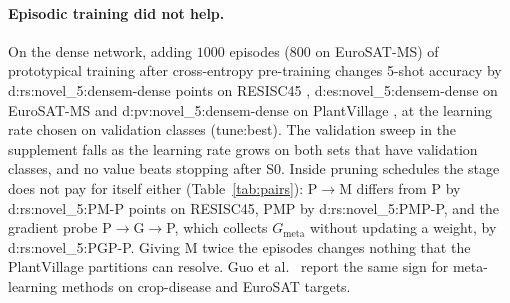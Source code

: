 \begin{table}[t]
  \centering\small\setlength{\tabcolsep}{4pt}
  
  \caption{Paired differences in points (mean over partitions, with the $95\%$ $t$-interval over partitions in brackets); (a $-$ b) is positive when a is more accurate. Test episodes are shared inside a partition. A dash marks a comparison that was not run on that dataset.}
  \label{tab:pairs}
\end{table}

\paragraph{Episodic training did not help.}
On the dense network, adding $1000$ episodes ($800$ on EuroSAT-MS) of prototypical training after cross-entropy pre-training changes 5-shot accuracy by \num{d:rs:novel_5:densem-dense} points on RESISC45 , \num{d:es:novel_5:densem-dense} on EuroSAT-MS  and \num{d:pv:novel_5:densem-dense} on PlantVillage , at the learning rate chosen on validation classes (\num{tune:best}). The validation sweep in the supplement falls as the learning rate grows on both sets that have validation classes, and no value beats stopping after S0. Inside pruning schedules the stage does not pay for itself either (Table~\ref{tab:pairs}): P$\to$M differs from P by \num{d:rs:novel_5:PM-P} points on RESISC45, PMP by \num{d:rs:novel_5:PMP-P}, and the gradient probe P$\to$G$\to$P, which collects $G_{\mathrm{meta}}$ without updating a weight, by \num{d:rs:novel_5:PGP-P}. Giving M twice the episodes changes nothing that the PlantVillage partitions can resolve. Guo et al.~\cite{guo2020bscd} report the same sign for meta-learning methods on crop-disease and EuroSAT targets.

\begin{table}[t]
  \centering\small\setlength{\tabcolsep}{4pt}
  
  \caption{Cost and 5-shot accuracy (\%). The pruned architecture is the same for every score, so one cost row serves all scores; accuracy is for DACIS under PMP. Cost is for a $128{\times}128$ RGB input: CPU is single-thread latency at batch size 1 on \num{hw-cpu}, GPU throughput is at batch size 128 on \num{hw-gpu}. Latency is measured, not a statement about embedded devices. The accuracy columns use each dataset's own input size and bands.}
  \label{tab:budget}
\end{table}

